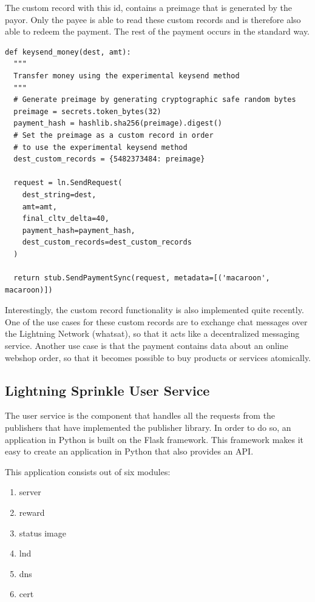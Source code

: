 The custom record with this id, contains a preimage that is generated by the payor. Only the payee is able to read these custom records and is therefore also able to redeem the payment. The rest of the payment occurs in the standard way.
\lstset{language=Python}
\lstset{frame=lines}
\lstset{basicstyle=\footnotesize}
\begin{lstlisting}
def keysend_money(dest, amt):
  """ 
  Transfer money using the experimental keysend method
  """
  # Generate preimage by generating cryptographic safe random bytes
  preimage = secrets.token_bytes(32) 
  payment_hash = hashlib.sha256(preimage).digest()
  # Set the preimage as a custom record in order 
  # to use the experimental keysend method
  dest_custom_records = {5482373484: preimage}

  request = ln.SendRequest(
    dest_string=dest,
    amt=amt,
    final_cltv_delta=40,
    payment_hash=payment_hash,
    dest_custom_records=dest_custom_records
  )
  
  return stub.SendPaymentSync(request, metadata=[('macaroon', macaroon)])

\end{lstlisting}

Interestingly, the custom record functionality is also implemented quite recently. One of the use cases for these custom records are to exchange chat messages over the Lightning Network (whatsat), so that it acts like a decentralized messaging service. Another use case is that the payment contains data about an online webshop order, so that it becomes possible to buy products or services atomically.


\subsection{Lightning Sprinkle User Service}

The user service is the component that handles all the requests from the publishers that have implemented the publisher library. In order to do so, an application in Python is built on the Flask framework. This framework makes it easy to create an application in Python that also provides an API.

This application consists out of six modules:
\begin{enumerate}
  \item server
  \item reward
  \item status image
  \item lnd
  \item dns
  \item cert 
\end{enumerate}

